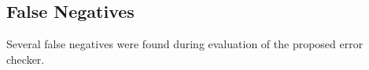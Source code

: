 \subsection{False Negatives}

Several false negatives were found during evaluation of the proposed error checker. 